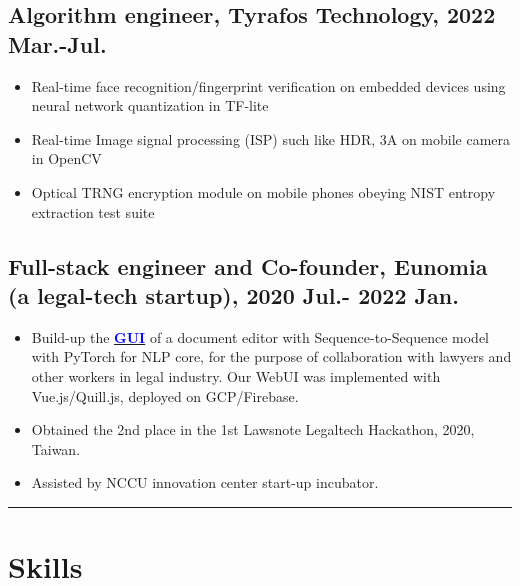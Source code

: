 \documentclass[11pt]{article}
\begin{document}
\begin{multicols*}{2}
\vspace{0.8em}

\subsection*{\textbf{Algorithm engineer}, Tyrafos Technology, 2022 Mar.-Jul.}
\begin{itemize}[noitemsep]
    \item Real-time face recognition/fingerprint verification on embedded devices using neural network quantization in TF-lite
    \item Real-time Image signal processing (ISP) such like HDR, 3A on mobile camera in OpenCV
    \item Optical TRNG encryption module on mobile phones obeying NIST entropy extraction test suite
\end{itemize}

\vspace{0.8em}

\subsection*{Full-stack engineer and Co-founder, Eunomia (a legal-tech startup), 2020 Jul.- 2022 Jan.}
\begin{itemize}[noitemsep]
    \item Build-up the \href{https://github.com/Kuo-TingKai/Eunomia}{\textbf{\textcolor{blue}{GUI}}} of a document editor with Sequence-to-Sequence model with PyTorch for NLP core, for the purpose of collaboration with lawyers and other workers in legal industry. Our WebUI was implemented with Vue.js/Quill.js, deployed on GCP/Firebase.
    \item Obtained the 2nd place in the 1st Lawsnote Legaltech Hackathon, 2020, Taiwan.
    \item Assisted by NCCU innovation center start-up incubator.
\end{itemize}

\hrule

\section*{Skills}

\end{multicols*}
\end{document}

